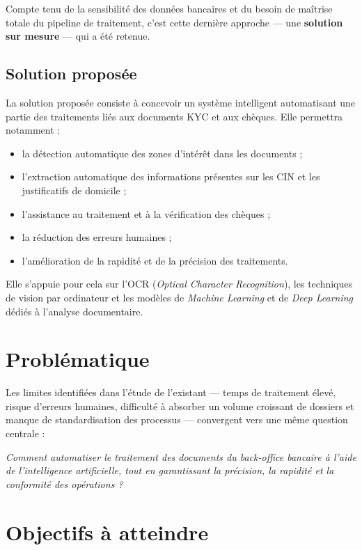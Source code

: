 Compte tenu de la sensibilité des données bancaires et du besoin de maîtrise
totale du pipeline de traitement, c'est cette dernière approche — une
\textbf{solution sur mesure} — qui a été retenue.

\subsection*{Solution proposée}

La solution proposée consiste à concevoir un système intelligent automatisant
une partie des traitements liés aux documents KYC et aux chèques. Elle
permettra notamment :

\begin{itemize}
    \item la détection automatique des zones d'intérêt dans les documents ;
    \item l'extraction automatique des informations présentes sur les CIN et
    les justificatifs de domicile ;
    \item l'assistance au traitement et à la vérification des chèques ;
    \item la réduction des erreurs humaines ;
    \item l'amélioration de la rapidité et de la précision des traitements.
\end{itemize}

Elle s'appuie pour cela sur l'OCR (\textit{Optical Character Recognition}),
les techniques de vision par ordinateur et les modèles de \textit{Machine
Learning} et de \textit{Deep Learning} dédiés à l'analyse documentaire.

\section{Problématique}

Les limites identifiées dans l'étude de l'existant — temps de traitement
élevé, risque d'erreurs humaines, difficulté à absorber un volume croissant
de dossiers et manque de standardisation des processus — convergent vers une
même question centrale :

\begin{center}
\textit{Comment automatiser le traitement des documents du back-office
bancaire à l'aide de l'intelligence artificielle, tout en garantissant la
précision, la rapidité et la conformité des opérations ?}
\end{center}

\section{Objectifs à atteindre}

